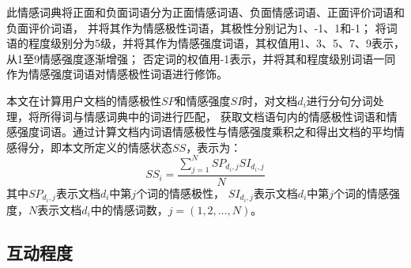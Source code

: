 此情感词典将正面和负面词语分为正面情感词语、负面情感词语、正面评价词语和负面评价词语，
并将其作为情感极性词语，其极性分别记为1、-1、1和-1；
将词语的程度级别分为5级，并将其作为情感强度词语，其权值用1、3、5、7、9表示，从1至9情感强度逐渐增强；
否定词的权值用-1表示，并将其和程度级别词语一同作为情感强度词语对情感极性词语进行修饰。

本文在计算用户文档的情感极性$SP$和情感强度$SI$时，对文档$d_i$进行分句分词处理，将所得词与情感词典中的词进行匹配，
获取文档语句内的情感极性词语和情感强度词语。通过计算文档内词语情感极性与情感强度乘积之和得出文档的平均情感得分，即本文所定义的情感状态$SS$，表示为：
\begin{equation}\label{eq:2.3}
    SS_i= \frac{\sum^N_{j=1} SP_{d_i , j} SI_{d_i , j} }{N}
\end{equation}
其中$SP_{d_i , j} $表示文档$d_i$中第$j$个词的情感极性，
$SI_{d_i , j} $表示文档$d_i$中第$j$个词的情感强度，$N$表示文档$d_i$中的情感词数，$j=(1,2,\ldots,N)$。

\subsection{互动程度}\label{subsection:2.2.3}

